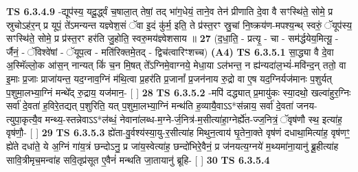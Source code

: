 \documentclass[17pt]{extarticle}
\begin{document}
                  \newline
                                \textbf{ TS 6.3.4.9} \newline
                  -द्यूप॑स्य॒ यदू॒र्द्ध्वं च॒षाला॒त् तेषां॒ तद् भा॑ग॒धेयं॒ ताने॒व तेन॑ प्रीणाति दे॒वा वै सꣳस्थि॑ते॒ सोमे॒ प्र स्रुचोऽह॑र॒न् प्र यूपं॒ ते॑ऽमन्यन्त यज्ञ्वेश॒सं ॅवा इ॒दं कु॑र्म॒ इति॒ ते प्र॑स्त॒रꣳ स्रु॒चां नि॒ष्क्रय॑ण-मपश्य॒न्थ् स्वरुं॒ ॅयूप॑स्य॒ सꣳस्थि॑ते॒ सोमे॒ प्र प्र॑स्त॒रꣳ हर॑ति जु॒होति॒ स्वरु॒मय॑ज्ञ्वेशसाय ॥ \textbf{  27} \newline
                  \newline
                      (द॒धा॒ति॒ - प्रत्यृ॒ - चा - सम॑र्द्धयेय॒मित्यू॒ - र्जैनं॒ - ॅविश्वे॑षां - ॅयूप॒त्व - मति॑रिक्तमे॒तद् - द्विच॑त्वारिꣳशच्च)  \textbf{(A4)} \newline \newline
                                        \textbf{ TS 6.3.5.1} \newline
                  सा॒द्ध्या वै दे॒वा अ॒स्मिॅल्लो॒क आ॑स॒न् नान्यत् किं॑ च॒न मि॒षत् ते᳚ऽग्निमे॒वाग्नये॒ मेधा॒या ऽल॑भन्त॒ न ह्य॑न्यदा॑ल॒भ्यं॑-मवि॑न्द॒न् ततो॒ वा इ॒माः प्र॒जाः प्राजा॑यन्त॒ यद॒ग्नाव॒ग्निं म॑थि॒त्वा प्र॒हर॑ति प्र॒जानां᳚ प्र॒जन॑नाय रु॒द्रो वा ए॒ष यद॒ग्निर्यज॑मानः प॒शुर्यत् प॒शुमा॒लभ्या॒ग्निं मन्थे᳚द् रु॒द्राय॒ यज॑मान॒- [  ] \textbf{  28} \newline
                  \newline
                                \textbf{ TS 6.3.5.2} \newline
                  -मपि॑ दद्ध्यात् प्र॒मायु॑कः स्या॒दथो॒ खल्वा॑हुर॒ग्निः सर्वा॑ दे॒वता॑ ह॒विरे॒तद्यत् प॒शुरिति॒ यत् प॒शुमा॒लभ्या॒ग्निं मन्थ॑ति ह॒व्यायै॒वाऽऽ*स॑न्नाय॒ सर्वा॑ दे॒वता॑ जनय-त्युपा॒कृत्यै॒व मन्थ्य॒-स्तन्नेवाऽऽ*ल॑ब्धं॒ नेवाना॑लब्ध-म॒ग्ने-र्ज॒नित्र॑-म॒सीत्या॑हा॒ग्नेर्ह्ये॑त-ज्ज॒नित्रं॒ ॅवृष॑णौ स्थ॒ इत्या॑ह॒ वृष॑णौ॒- [  ] \textbf{  29} \newline
                  \newline
                                \textbf{ TS 6.3.5.3} \newline
                  ह्ये॑ता-वु॒र्वश्य॑स्या॒यु-र॒सीत्या॑ह मिथुन॒त्वाय॑ घृ॒तेना॒क्ते वृष॑णं दधाथा॒मित्या॑ह॒ वृष॑णꣳ॒॒ ह्ये॑ते दधा॑ते॒ ये अ॒ग्निं गा॑य॒त्रं छन्दोऽनु॒ प्र जा॑य॒स्वेत्या॑ह॒ छन्दो॑भिरे॒वैनं॒ प्र ज॑नयत्य॒ग्नये॑ म॒थ्यमा॑ना॒यानु॑ ब्रू॒हीत्या॑ह सावि॒त्रीमृच॒मन्वा॑ह सवि॒तृप्र॑सूत ए॒वैनं॑ मन्थति जा॒तायानु॑ ब्रूहि- [  ] \textbf{  30} \newline
                  \newline
                                \textbf{ TS 6.3.5.4} \newline
\end{document}
